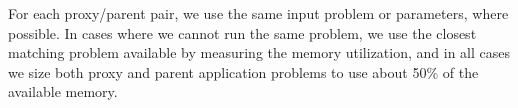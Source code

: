 For each proxy/parent pair, we use the same input problem or parameters, where possible. In cases where we cannot run the same problem, we use the closest matching problem available by measuring the memory utilization, and in all cases we size both proxy and parent application problems to use about 50\% of the available memory. 
